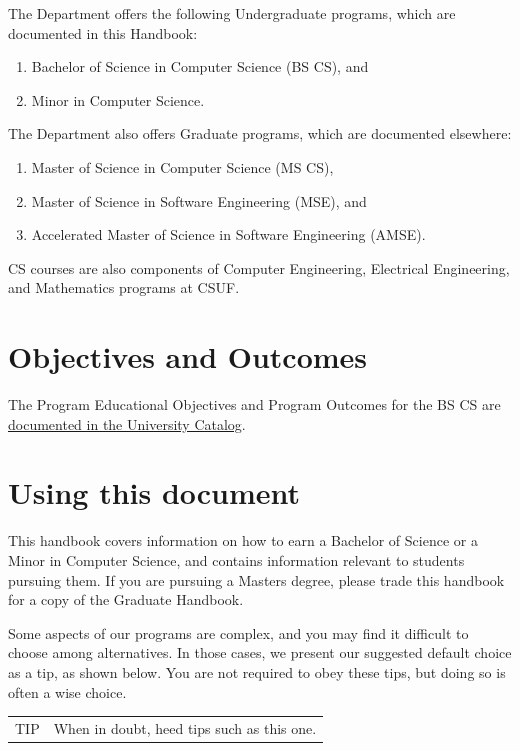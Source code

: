 \documentclass{book}
\newcommand{\campusname}{CSUF}
\newenvironment{tip}
    {\tcolorbox \begin{tabular}{m{.5in} m{5in}} \Large{TIP} & }
    {\end{tabular} \endtcolorbox}
\begin{document}
The Department offers the following Undergraduate programs, which are documented in this Handbook:
\begin{enumerate}
\item Bachelor of Science in Computer Science (BS CS), and
\item Minor in Computer Science.
\end{enumerate}

The Department also offers Graduate programs, which are documented elsewhere:
\begin{enumerate}
\item Master of Science in Computer Science (MS CS),
\item Master of Science in Software Engineering (MSE), and
\item Accelerated Master of Science in Software Engineering (AMSE).
\end{enumerate}

CS courses are also components of Computer Engineering, Electrical Engineering, and Mathematics programs at \campusname.

\section{Objectives and Outcomes}
 
The Program Educational Objectives and Program Outcomes for the BS CS are \href{http://catalog.fullerton.edu/preview_entity.php?catoid=2&ent_oid=113&returnto=137#Learning_Goals_and_Student_Learning_Outcomes}{documented in the University Catalog}.

\section{Using this document}

This handbook covers information on how to earn a Bachelor of Science or a Minor in Computer Science, and contains information relevant to students pursuing them. If you are pursuing a Masters degree, please trade this handbook for a copy of the Graduate Handbook.

Some aspects of our programs are complex, and you may find it difficult to choose among alternatives. In those cases, we present our suggested default choice as a tip, as shown below. You are not required to obey these tips, but doing so is often a wise choice.
\begin{tip}
When in doubt, heed tips such as this one.
\end{tip}
\end{document}
